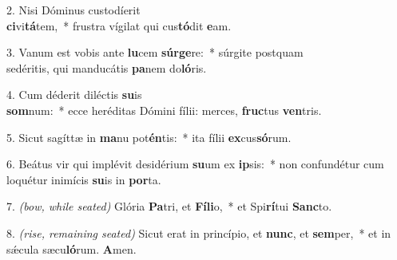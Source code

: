 2. Nisi Dóminus custodíerit\\ \textbf{ci}vi\textbf{tá}tem,~* frustra vígilat qui cus\textbf{tó}dit \textbf{e}am.

3. Vanum est vobis ante \textbf{lu}cem \textbf{súr}\textbf{ge}re:~* súrgite postquam\\ sedéritis, qui manducátis \textbf{pa}nem do\textbf{ló}ris.

4. Cum déderit diléctis \textbf{su}is\\ \textbf{som}num:~* ecce heréditas Dómini fílii: merces, \textbf{fruc}tus \textbf{ven}tris.

5. Sicut sagíttæ in \textbf{ma}nu pot\textbf{én}tis:~* ita fílii \textbf{ex}cus\textbf{só}rum.

6. Beátus vir qui implévit desidérium \textbf{su}um ex \textbf{ip}sis:~* non confundétur cum loquétur inimícis \textbf{su}is in \textbf{por}ta.

7. {\color{red}\textit{(bow, while seated)}} Glória \textbf{Pa}tri, et \textbf{Fí}\textbf{li}o,~* et Spi\textbf{rí}tui \textbf{Sanc}to.

8. {\color{red}\textit{(rise, remaining seated)}} Sicut erat in princípio, et \textbf{nunc}, et \textbf{sem}per,~* et in s\'{\ae}cula sæcu\textbf{ló}rum. \textbf{A}men.
